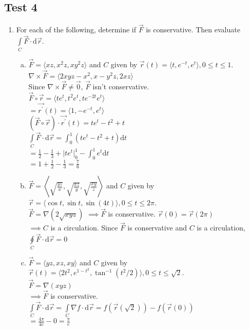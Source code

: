 \subsection{Test 4}
\begin{enumerate}
	\item For each of the following, determine if $\vec{F}$ is conservative. Then evaluate $\int\limits_{C}{\vec{F}\cdot\mathrm{d}\vec{r}}$.
	\begin{enumerate}[a.]
		\item $\vec{F} = \langle xz, x^2z, xy^2z \rangle$ and $C$ given by $\vec{r}(t) = \langle t, e^{-t}, e^t\rangle, 0 \leq t \leq 1$.\\
		$\nabla \times \vec{F} = \langle 2xyz-x^2, x-y^2z, 2xz \rangle$\\
		Since $\nabla \times \vec{F} \neq \vec{0}$, $\vec{F}$ isn't conservative.\\
		$\vec{F}\circ\vec{r} = \langle te^t, t^2e^t, te^{-2t}e^t \rangle$\\
		$= \vec{r^\prime}(t) = \langle 1, -e^{-t}, e^t\rangle$\\
		$\left(\vec{F}\circ\vec{r}\right) \cdot \vec{r^\prime}(t) = te^t - t^2 + t$\\
		$\int\limits_{C}{\vec{F} \cdot \mathrm{d}\vec{r}} = \int_{0}^{1}{\left(te^t - t^2 + t\right)\mathrm{d}t}$\\
		$= \frac{1}{2} - \frac{1}{3} + \lvert te^t\rvert_{0}^{1} - \int_{0}^{1}{e^t\mathrm{d}t}$\\
		$= 1 + \frac{1}{2} - \frac{1}{3} = \frac{7}{6}$\\
		
		\item $\vec{F} = \left< \sqrt{\frac{yz}{x}}, \sqrt{\frac{xz}{y}}, \sqrt{\frac{xy}{z}} \right>$ and $C$ given by $\vec{r} = \langle \cos{t}, \sin{t}, \sin{(4t)} \rangle, 0 \leq t \leq 2\pi$.\\
		\indent
		$\vec{F} = \nabla(2\sqrt{xyz})$
		$\implies \vec{F}$ is conservative.
		$\vec{r}(0) = \vec{r}(2\pi)$\\
		$\implies C$ is a circulation.
		Since $\vec{F}$ is conservative and $C$ is a circulation, $\oint\limits_{C}{\vec{F} \cdot \mathrm{d}\vec{r}} = 0$\\
		
		\item $\vec{F} = \langle yz, xz, xy \rangle$ and $C$ given by $\vec{r}(t) = \langle 2t^2, e^{1-t^2}, \tan^{-1}{(t^2/2)} \rangle, 0 \leq t \leq \sqrt{2}$.\\
		$\vec{F} = \nabla(xyz)$\\
		$\implies\vec{F}$ is conservative.\\
		$\int\limits_{C}{\vec{F} \cdot \mathrm{d}\vec{r}} = \int\limits_{C}{\nabla f \cdot \mathrm{d}\vec{r}} = f(\vec{r}(\sqrt{2})) - f(\vec{r}(0))$\\
		$= \frac{4\pi}{4e} - 0 = \frac{\pi}{e}$\\
	\end{enumerate}
	

\end{enumerate}
